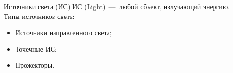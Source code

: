\documentclass{beamer}
\begin{document}
	\begin{frame}{Источники света (ИС)}
		ИС (Light)~---~любой объект, излучающий энергию. \\
		Типы источников света:
		\begin{itemize}
			\item Источники направленного света;
			\item Точечные ИС;
			\item Прожекторы.
		\end{itemize}
		\note{
		}

	\end{frame}
	\fi
\end{document}
